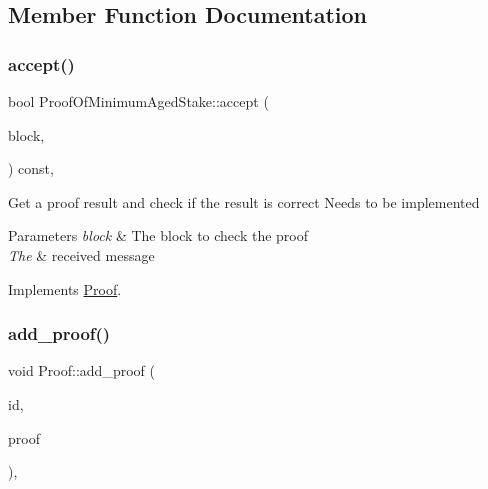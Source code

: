 \subsection{Member Function Documentation}
\mbox{\label{classProofOfMinimumAgedStake_aa42f7b715bb986143b5dda841782745b}} 
\subsubsection{\texorpdfstring{accept()}{accept()}}
{\footnotesize\ttfamily bool Proof\+Of\+Minimum\+Aged\+Stake\+::accept (\begin{DoxyParamCaption}\item[{\mbox{\hyperlink{classBlock}{Block}} $\ast$}]{block,  }\item[{\mbox{\hyperlink{classMessage}{Message}} $\ast$}]{ }\end{DoxyParamCaption}) const\hspace{0.3cm}{\ttfamily [override]}, {\ttfamily [virtual]}}

Get a proof result and check if the result is correct Needs to be implemented


\begin{DoxyParams}{Parameters}
{\em block} & The block to check the proof \\
\hline
{\em The} & received message \\
\hline
\end{DoxyParams}


Implements \mbox{\hyperlink{classProof_a358b3883eb33b8ecc93f74cb6313679a}{Proof}}.

\mbox{\label{classProof_a71874539fdbcc93c15594b889c95225b}} 
\subsubsection{\texorpdfstring{add\+\_\+proof()}{add\_proof()}}
{\footnotesize\ttfamily void Proof\+::add\+\_\+proof (\begin{DoxyParamCaption}\item[{int}]{id,  }\item[{std\+::function$<$ \mbox{\hyperlink{classProof}{Proof}} $\ast$()$>$}]{proof }\end{DoxyParamCaption})\hspace{0.3cm}{\ttfamily [static]}, {\ttfamily [inherited]}}

